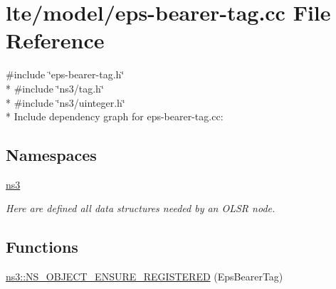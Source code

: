 \hypertarget{eps-bearer-tag_8cc}{}\section{lte/model/eps-\/bearer-\/tag.cc File Reference}
\label{eps-bearer-tag_8cc}
{\ttfamily \#include \char`\"{}eps-\/bearer-\/tag.\+h\char`\"{}}\\*
{\ttfamily \#include \char`\"{}ns3/tag.\+h\char`\"{}}\\*
{\ttfamily \#include \char`\"{}ns3/uinteger.\+h\char`\"{}}\\*
Include dependency graph for eps-\/bearer-\/tag.cc\+:
\subsection*{Namespaces}
\begin{DoxyCompactItemize}
\item 
 \hyperlink{namespacens3}{ns3}
\begin{DoxyCompactList}\small\item\em Here are defined all data structures needed by an O\+L\+SR node. \end{DoxyCompactList}\end{DoxyCompactItemize}
\subsection*{Functions}
\begin{DoxyCompactItemize}
\item 
\hyperlink{namespacens3_ae1d75cc15eabe5cea473ecc9f3c74db4}{ns3\+::\+N\+S\+\_\+\+O\+B\+J\+E\+C\+T\+\_\+\+E\+N\+S\+U\+R\+E\+\_\+\+R\+E\+G\+I\+S\+T\+E\+R\+ED} (Eps\+Bearer\+Tag)
\end{DoxyCompactItemize}
